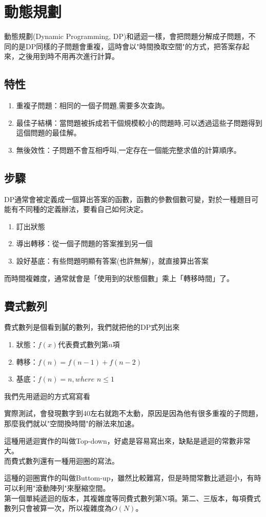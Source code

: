\section{動態規劃}
動態規劃(Dynamic Programming, DP)和遞迴一樣，會把問題分解成子問題，不同的是DP同樣的子問題會重複，這時會以"時間換取空間"的方式，把答案存起來，之後用到時不用再次進行計算。
\subsection{特性}
\begin{enumerate}
\item 重複子問題：相同的一個子問題,需要多次查詢。
\item 最佳子結構：當問題被拆成若干個規模較小的問題時,可以透過這些子問題得到這個問題的最佳解。
\item 無後效性：子問題不會互相呼叫,一定存在一個能完整求值的計算順序。
\end{enumerate}
\subsection{步驟}
DP通常會被定義成一個算出答案的函數，函數的參數個數可變，對於一種題目可能有不同種的定義辦法，要看自己如何決定。
\begin{enumerate}
\item 訂出狀態
\item 導出轉移：從一個子問題的答案推到另一個
\item 設好基底：有些問題明顯有答案(也許無解)，就直接算出答案
\end{enumerate}
而時間複雜度，通常就會是「使用到的狀態個數」乘上「轉移時間」了。
\subsection{費式數列}
費式數列是個看到膩的數列，我們就把他的DP式列出來
\begin{enumerate}
\item 狀態：$f(x)$代表費式數列第$n$項
\item 轉移：$f(n)=f(n-1)+f(n-2)$
\item 基底：$f(n)=n,where$ $n\leq 1$
\end{enumerate}
我們先用遞迴的方式寫寫看

實際測試，會發現數字到40左右就跑不太動，原因是因為他有很多重複的子問題，那麼我們就以"空間換時間"的辦法來加速。

這種用遞迴實作的叫做Top-down，好處是容易寫出來，缺點是遞迴的常數非常大。\\
而費式數列還有一種用迴圈的寫法。

這種的迴圈實作的叫做Buttom-up，雖然比較難寫，但是時間常數比遞迴小，有時可以利用"滾動陣列"來壓縮空間。\\
第一個單純遞迴的版本，其複雜度等同費式數列第N項。第二、三版本，每項費式數列只會被算一次，所以複雜度為$O(N)$。
